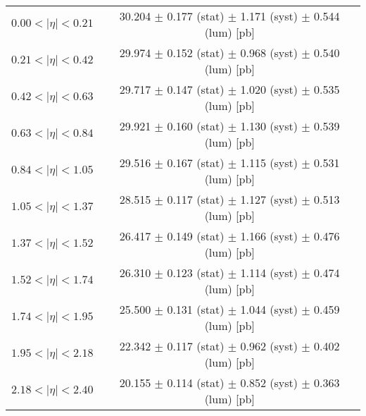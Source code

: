 \begin{tabular}{lc}
\hline
$0.00 < |\eta| <0.21$          & 30.204 $\pm$ 0.177 (stat) $\pm$ 1.171 (syst) $\pm$ 0.544 (lum) [pb]  \\
$0.21 < |\eta| <0.42$          & 29.974 $\pm$ 0.152 (stat) $\pm$ 0.968 (syst) $\pm$ 0.540 (lum) [pb]  \\
$0.42 < |\eta| <0.63$          & 29.717 $\pm$ 0.147 (stat) $\pm$ 1.020 (syst) $\pm$ 0.535 (lum) [pb]  \\
$0.63 < |\eta| <0.84$          & 29.921 $\pm$ 0.160 (stat) $\pm$ 1.130 (syst) $\pm$ 0.539 (lum) [pb]  \\
$0.84 < |\eta| <1.05$          & 29.516 $\pm$ 0.167 (stat) $\pm$ 1.115 (syst) $\pm$ 0.531 (lum) [pb]  \\
$1.05 < |\eta| <1.37$          & 28.515 $\pm$ 0.117 (stat) $\pm$ 1.127 (syst) $\pm$ 0.513 (lum) [pb]  \\
$1.37 < |\eta| <1.52$          & 26.417 $\pm$ 0.149 (stat) $\pm$ 1.166 (syst) $\pm$ 0.476 (lum) [pb]  \\
$1.52 < |\eta| <1.74$          & 26.310 $\pm$ 0.123 (stat) $\pm$ 1.114 (syst) $\pm$ 0.474 (lum) [pb]  \\
$1.74 < |\eta| <1.95$          & 25.500 $\pm$ 0.131 (stat) $\pm$ 1.044 (syst) $\pm$ 0.459 (lum) [pb]  \\
$1.95 < |\eta| <2.18$          & 22.342 $\pm$ 0.117 (stat) $\pm$ 0.962 (syst) $\pm$ 0.402 (lum) [pb]  \\
$2.18 < |\eta| <2.40$          & 20.155 $\pm$ 0.114 (stat) $\pm$ 0.852 (syst) $\pm$ 0.363 (lum) [pb]  \\
\hline
\end{tabular}
